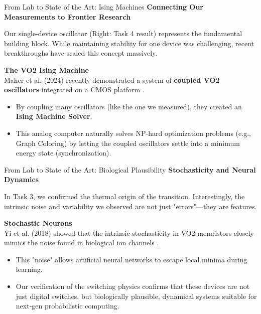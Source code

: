 \documentclass[aspectratio=169]{beamer}
\begin{document}
\begin{frame}{From Lab to State of the Art: Ising Machines}
    \textbf{Connecting Our Measurements to Frontier Research}
    
    \vspace{0.4cm}

    Our single-device oscillator (Right: Task 4 result) represents the fundamental building block. While maintaining stability for one device was challenging, recent breakthroughs have scaled this concept massively.
    
    \vspace{0.4cm}
    
    \textbf{The VO2 Ising Machine} \\
    Maher et al. (2024) recently demonstrated a system of \textbf{coupled VO2 oscillators} integrated on a CMOS platform \cite{maher}.
    \begin{itemize}
        \item By coupling many oscillators (like the one we measured), they created an \textbf{Ising Machine Solver}.
        \item This analog computer naturally solves NP-hard optimization problems (e.g., Graph Coloring) by letting the coupled oscillators settle into a minimum energy state (synchronization).
    \end{itemize}
\end{frame}

\begin{frame}{From Lab to State of the Art: Biological Plausibility}
    \textbf{Stochasticity and Neural Dynamics}
    
    \vspace{0.4cm}

    In Task 3, we confirmed the thermal origin of the transition. Interestingly, the intrinsic noise and variability we observed are not just "errors"—they are features.
    
    \vspace{0.4cm}
    
    \textbf{Stochastic Neurons} \\
    Yi et al. (2018) showed that the intrinsic stochasticity in VO2 memristors closely mimics the noise found in biological ion channels \cite{yi}.
    \begin{itemize}
        \item This "noise" allows artificial neural networks to escape local minima during learning.
        \item Our verification of the switching physics confirms that these devices are not just digital switches, but biologically plausible, dynamical systems suitable for next-gen probabilistic computing.
    \end{itemize}
\end{frame}
\end{document}
